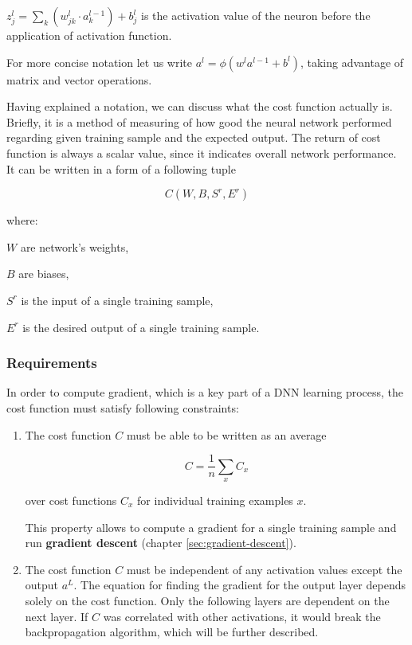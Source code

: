 $z^l_j = \sum_k (w^l_{jk} \cdot a^{l-1}_k) + b^l_j$ is the activation value of the neuron before the application of activation function.

\vspace{.5cm}

For more concise notation let us write $a^l = \phi(w^l a^{l-1} + b^l)$, taking advantage of matrix and vector operations.

Having explained a notation, we can discuss what the cost function actually is. Briefly, it is a method of measuring of how good the neural network performed regarding given training sample and the expected output. The return of cost function is always a scalar value, since it indicates overall network performance. It can be written in a form of a following tuple

\begin{equation}
    C(W, B, S^r, E^r)
\end{equation}

where:

$W$ are network's weights,

$B$ are biases,

$S^r$ is the input of a single training sample,

$E^r$ is the desired output of a single training sample.

\newpage

\subsubsection*{Requirements}
\label{sub2:cost-requirements}

In order to compute gradient, which is a key part of a DNN learning process, the cost function must satisfy following constraints:

\begin{enumerate}
    \item The cost function $C$ must be able to be written as an average
    
        \begin{equation}
            C = \frac{1}{n} \sum_x C_x
        \end{equation}
        
        over cost functions $C_x$ for individual training examples $x$.
    
        This property allows to compute a gradient for a single training sample and run \textbf{gradient descent} (chapter \ref{sec:gradient-descent}).
    
    \item The cost function $C$ must be independent of any activation values except the output $a^L$.
    The equation for finding the gradient for the output layer depends solely on the cost function. Only the following layers are dependent on the next layer. If $C$ was correlated with other activations, it would break the backpropagation algorithm, which will be further described.
\end{enumerate}

